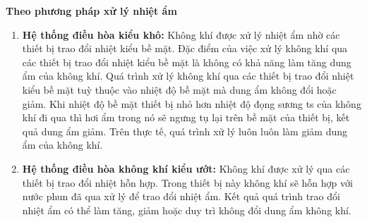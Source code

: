 	\textbf{Theo phương pháp xử lý nhiệt ẩm}
	\begin{enumerate}
		\setlength\itemsep{1mm}
		\item \textbf{Hệ thống điều hòa kiểu khô:} Không khí được xử lý nhiệt ẩm nhờ các thiết bị trao đổi nhiệt kiểu bề mặt. Đặc điểm của việc xử lý không khí qua các thiết bị trao đổi nhiệt kiểu bề mặt là không có khả năng làm tăng dung ẩm của không khí. Quá trình xử lý không khí qua các thiết bị trao đổi nhiệt kiểu bề mặt tuỳ thuộc vào nhiệt độ bề mặt mà dung ẩm không đổi hoặc giảm. Khi nhiệt độ bề mặt thiết bị nhỏ hơn nhiệt độ đọng sương ts của không khí đi qua thì hơi ẩm trong nó sẽ ngưng tụ lại trên bề mặt của thiết bị, kết quả dung ẩm giảm. Trên thực tế, quá trình xử lý luôn luôn làm giảm dung ẩm của không khí.
		\item \textbf{Hệ thống điều hòa không khí kiểu ướt:} Không khí được xử lý qua các thiết bị trao đổi nhiệt hỗn hợp. Trong thiết bị này không khí sẽ hỗn hợp với nước phun đã qua xử lý để trao đổi nhiệt ẩm. Kết quả quá trình trao đổi nhiệt ẩm có thể làm tăng, giảm hoặc duy trì không đổi dung ẩm không khí.
	\end{enumerate}
	
